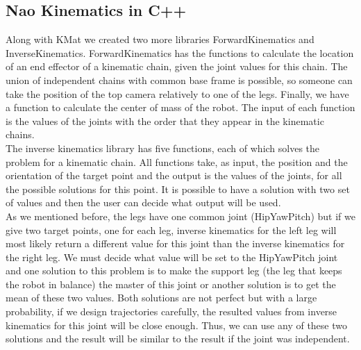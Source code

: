 \subsection{Nao Kinematics in C++}
Along with KMat we created two more libraries ForwardKinematics and InverseKinematics. ForwardKinematics has the functions to calculate the location of an end effector of a kinematic chain, given the joint values for this chain. The union of independent chains with common base frame is possible, so someone can take the position of the top camera relatively to one of the legs. Finally, we have a function to calculate the center of mass of the robot. The input of each function is the values of the joints with the order that they appear in the kinematic chains.\\
The inverse kinematics library has five functions, each of which solves the problem for a kinematic chain. All functions take, as input, the position and the orientation of the target point and the output is the values of the joints, for all the possible solutions for this point. It is possible to have a solution with two set of values and then the user can decide what output will be used. \\
As we mentioned before, the legs have one common joint (HipYawPitch) but if we give two target points, one for each leg, inverse kinematics for the left leg will most likely  return a different value for this joint than the inverse kinematics for the right leg. We must decide what value will be set to the HipYawPitch joint and one solution to this problem is to make the support leg (the leg that keeps the robot in balance) the master of this joint or another solution is to get the mean of these two values. Both solutions are not perfect but with a large probability, if we design trajectories carefully, the resulted values from inverse kinematics for this joint will be close enough. Thus, we can use any of these two solutions and the result will be similar to the result if the joint was independent.

